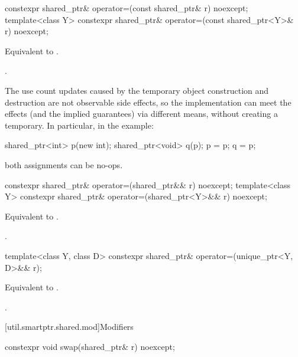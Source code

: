 %
\begin{itemdecl}
constexpr shared_ptr& operator=(const shared_ptr& r) noexcept;
template<class Y> constexpr shared_ptr& operator=(const shared_ptr<Y>& r) noexcept;
\end{itemdecl}

\begin{itemdescr}
\pnum
\effects
Equivalent to .

\pnum
\returns
{}.

\pnum
\begin{note}
The use count updates caused by the temporary object
construction and destruction are not observable side
effects, so the implementation can meet the effects (and the
implied guarantees) via different means, without creating a
temporary. In particular, in the example:
\begin{codeblock}
shared_ptr<int> p(new int);
shared_ptr<void> q(p);
p = p;
q = p;
\end{codeblock}
both assignments can be no-ops.
\end{note}
\end{itemdescr}

%
\begin{itemdecl}
constexpr shared_ptr& operator=(shared_ptr&& r) noexcept;
template<class Y> constexpr shared_ptr& operator=(shared_ptr<Y>&& r) noexcept;
\end{itemdecl}

\begin{itemdescr}
\pnum
\effects
Equivalent to .

\pnum
\returns
{}.
\end{itemdescr}

%
\begin{itemdecl}
template<class Y, class D> constexpr shared_ptr& operator=(unique_ptr<Y, D>&& r);
\end{itemdecl}

\begin{itemdescr}
\pnum
\effects
Equivalent to .

\pnum
\returns
{}.
\end{itemdescr}

[util.smartptr.shared.mod]{Modifiers}

%
\begin{itemdecl}
constexpr void swap(shared_ptr& r) noexcept;
\end{itemdecl}

